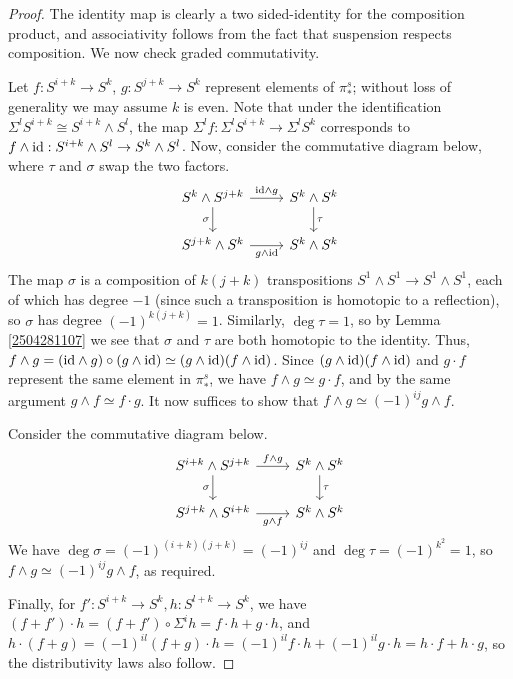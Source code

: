 \documentclass[11pt, titlepage]{article} %
\def\id{\ensuremath\text{id}}
\numberwithin{equation}{subsection}
\theoremstyle{plain}
\theoremstyle{definition}
\begin{document}
\begin{proof}
The identity map is clearly a two sided-identity for the composition product, and associativity follows from the fact that suspension respects composition. We now check graded commutativity.

Let \(f : S^{i+k}\to S^k\), \(g : S^{j+k}\to S^k\) represent elements of \(\pi_*^s\); without loss of generality we may assume \(k\) is even. Note that under the identification \(\Sigma^l S^{i+k} \cong S^{i+k} \wedge S^l\), the map \(\Sigma^l f : \Sigma^l S^{i+k} \to \Sigma^l S^k\) corresponds to \(f \wedge \id : S^{i+k}\wedge S^l \to S^k \wedge S^l\). Now, consider the commutative diagram below, where \(\tau\) and \(\sigma\) swap the two factors. 
\[\begin{tikzcd}
S^k\wedge S^{j+k} \arrow[r, "\id \wedge g"] \arrow[d, swap, "\sigma"]  & S^k \wedge S^k \arrow[d, "\tau"]  \\
S^{j+k}\wedge S^k \arrow[r, swap, "g \wedge \id"]  & S^k \wedge S^k
\end{tikzcd}\]
The map \(\sigma\) is a composition of \(k(j+k)\) transpositions \(S^1 \wedge S^1 \to S^1 \wedge S^1\), each of which has degree \(-1\) (since such a transposition is homotopic to a reflection), so \(\sigma\) has degree \((-1)^{k(j+k)}=1\). Similarly, \(\deg \tau=1\), so by Lemma \ref{2504281107} we see that \(\sigma\) and \(\tau\) are both homotopic to the identity. Thus, \(f \wedge g = (\id \wedge g)\circ (g \wedge \id)\simeq (g \wedge \id)(f \wedge \id)\). Since \((g \wedge \id)(f \wedge \id)\) and \(g\cdot f\) represent the same element in \(\pi_*^s\), we have \(f \wedge g \simeq g\cdot f\), and by the same argument \(g \wedge f \simeq f \cdot g\). It now suffices to show that \(f \wedge g \simeq (-1)^{ij} g \wedge f\).

Consider the commutative diagram below.
\[\begin{tikzcd}
S^{i+k}\wedge S^{j+k} \arrow[r, "f \wedge g"] \arrow[d, swap, "\sigma"]  & S^k \wedge S^k \arrow[d, "\tau"]  \\
S^{j+k}\wedge S^{i+k} \arrow[r, swap, "g \wedge f"]  & S^k \wedge S^k
\end{tikzcd}\]
We have \(\deg \sigma=(-1)^{(i+k)(j+k)}=(-1)^{ij}\) and \(\deg \tau = (-1)^{k^2}=1\), so \(f\wedge g \simeq (-1)^{ij}g\wedge f\), as required.

Finally, for \(f' : S^{i+k}\to S^k, h : S^{l+k}\to S^k\), we have \((f+f')\cdot h= (f+f')\circ \Sigma^i h = f\cdot h + g \cdot h\), and \(h\cdot (f+g)=(-1)^{il}(f+g)\cdot h=(-1)^{il}f\cdot h + (-1)^{il}g \cdot h = h\cdot f +h \cdot g\), so the distributivity laws also follow. 
\end{proof}
\end{document}
